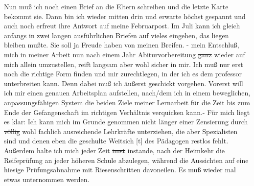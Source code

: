 \def\day{27. Juni 1944}
\mktitle

Nun mu{\ss} ich noch einen Brief an die Eltern schreiben und die letzte Karte bekommt sie.
Dann bin ich wieder mitten drin und erwarte h\"{o}chst gespannt und auch noch erfreut ihre Antwort auf meine Februarpost.
Im Juli kann ich gleich anfangs in zwei langen ausf\"{u}hrlichen Briefen auf vieles eingehen, das liegen bleiben mu{\ss}te.
Sie soll ja Freude haben von meinen Breifen.
- mein Entschlu{\ss}, mich in meiner Arbeit nun nach einem Jahr Abiturvorbereitung \st{ganz} wieder auf mich allein umzustellen, reift langsam aber wohl sicher in mir.
Ich mu{\ss} nur erst noch die richtige Form finden und mir zurechtlegen, in der ich es dem professor unterbreiten kann.
Denn dabei mu{\ss} ich \"{a}u{\ss}erst geschickt vorgehen.
Vorerst will ich mir einen genauen Arbeitsplan aufstellen, nach/dem ich in einem beweglichen, anpassungsf\"{a}higen System die beiden Ziele meiner Lernarbeit f\"{u}r die Zeit bis zum Ende der Gefangenschaft im richtigen Verh\"{a}ltnis verquicken kann.-
F\"{u}r mich liegt es klar: Ich kann mich im Grunde genommen nicht l\"{a}nger einer Zensierung durch \st{v\"{o}llig} wohl fachlich ausreichende Lehrkr\"{a}fte unterziehen, die aber Spezialisten sind und denen eben die geschulte Weitsich{\color{red} [t] } des P\"{a}dagogen restlos fehlt.
Au{\ss}erdem halte ich mich jeder Zeit \st{imst} instande, nach der Heimkehr die Reifepr\"{u}fung an jeder h\"{o}heren Schule abzulegen, w\"{a}hrend die Aussichten auf eine hiesige Pr\"{u}fungsabnahme mit Riesenschritten davoneilen.
Es mu{\ss} wieder mal etwas unternommen werden.

\clearpage
